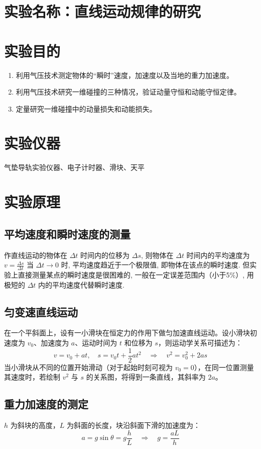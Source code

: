 \documentclass[12pt,a4paper]{article}
\begin{document}
	
	\section{实验名称：直线运动规律的研究}
	
	\section{实验目的}
		\begin{enumerate}[label=\arabic*.]
			\item 利用气压技术测定物体的“瞬时”速度，加速度以及当地的重力加速度。
			\item 利用气压技术研究一维碰撞的三种情况，验证动量守恒和动能守恒定律。
			\item 定量研究一维碰撞中的动量损失和动能损失。
		\end{enumerate}

	\section{实验仪器}
		气垫导轨实验仪器、电子计时器、滑块、天平

	\section{实验原理}
		\subsection{平均速度和瞬时速度的测量}
			作直线运动的物体在 $\Delta t$ 时间内的位移为 $\Delta s$, 则物体在 $\Delta t$ 时间内的平均速度为	$v = \frac{\Delta s}{\Delta t}$
			当 $\Delta t \to 0$ 时, 平均速度趋近于一个极限值, 即物体在该点的瞬时速度. 但实验上直接测量某点的瞬时速度是很困难的, 一般在一定误差范围内（小于5\%）, 用极短的 $\Delta t$ 内的平均速度代替瞬时速度.

		\subsection{匀变速直线运动}
			在一个平斜面上，设有一小滑块在恒定力的作用下做匀加速直线运动。设小滑块初速度为 \( v_0 \)、加速度为 \( a \)、运动时间为 \( t \) 和位移为 \( s \)，则运动学关系可描述为：
			\[v = v_0 + at,\quad s = v_0 t + \frac{1}{2}at^2 \quad \Rightarrow \quad v^2 = v_0^2 + 2as\]
			当小滑块从不同的位置开始滑动（对于起始时刻可视为 \( v_0 = 0 \)），在同一位置测量其速度时，若绘制 \( v^2 \) 与 \( s \) 的关系图，将得到一条直线，其斜率为 \( 2a \)。

		\subsection{重力加速度的测定}
			\( h \) 为斜块的高度，\( L \) 为斜面的长度，块沿斜面下滑的加速度为：
			\[a = g\sin\theta = g\frac{h}{L} \quad \Rightarrow \quad g = \frac{aL}{h}\]
\end{document}
